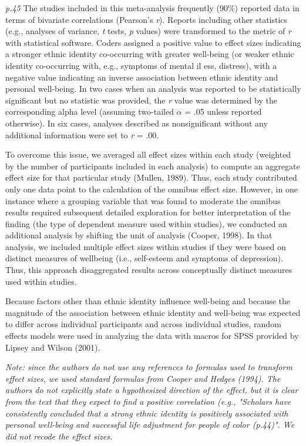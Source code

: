\documentclass{article}
\begin{document}
\textit{p.45} The studies included in this meta-analysis frequently (90\%) reported data in terms of bivariate correlations (Pearson’s \textit{r}). Reports including other statistics (e.g., analyses of variance, \textit{t} tests, \textit{p} values) were transformed to the metric of \textit{r} with statistical software. Coders assigned a positive value to effect sizes indicating a stronger ethnic identity co-occurring with greater well-being (or weaker ethnic identity co-occurring with, e.g., symptoms of mental il
ess, distress), with a negative value indicating an inverse association between ethnic identity and personal well-being. In two cases when an analysis was reported to be statistically significant but no statistic was provided, the \textit{r} value was determined by the corresponding alpha level (assuming two-tailed $\alpha$ = .05 unless reported otherwise). In six cases, analyses described as nonsignificant without any additional information were set to \textit{r} = .00.

To overcome this issue, we averaged all effect sizes within each study (weighted by the number of participants included in each analysis) to compute an aggregate effect size for that particular study (Mullen, 1989). Thus, each study contributed only one data point to the calculation of the omnibus effect size. However, in one instance where a grouping variable that was found to moderate the omnibus results required subsequent detailed exploration for better interpretation of the finding (the type of dependent measure used within studies), we conducted an additional analysis by shifting the unit of analysis (Cooper, 1998). In that analysis, we included multiple effect sizes within studies if they were based on distinct measures of wellbeing (i.e., self-esteem and symptoms of depression). Thus, this approach disaggregated results across conceptually distinct measures used within studies.

Because factors other than ethnic identity influence well-being and because the magnitude of the association between ethnic identity and well-being was expected to differ across individual participants and across individual studies, random effects models were used in analyzing the data with macros for SPSS provided by Lipsey and Wilson (2001).

\vspace{3 mm}
\textit{Note: since the authors do not use any references to formulas used to transform effect sizes, we used standard formulas from Cooper and Hedges (1994). The authors do not explicitly state a hypothesized direction of the effect, but it is clear from the text that they expect to find a positive correlation (e.g., "Scholars have consistently concluded that a strong ethnic identity is positively associated with personal well-being and successful life adjustment for people of color (p.44)". We did not recode the effect sizes. }
\end{document}

